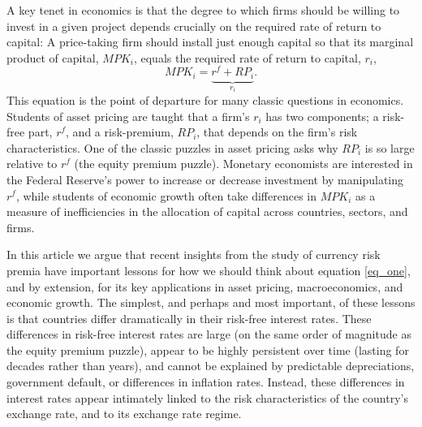 \documentclass{ar-1col}
\begin{document}
A key tenet in economics is that the degree to which firms should be willing to invest in a given project depends crucially on the required rate of return to capital: A price-taking firm should install just enough capital so that its marginal product of capital, $MPK_i$, equals the required rate of return to capital, $r_i$,
\begin{equation}
  MPK_i=\underbrace{r^f+RP_i}_{r_i}.
  \label{eq_one}
\end{equation} 
This equation is the point of departure for many classic questions in economics. Students of asset pricing are taught that a firm's $r_i$ has two components; a risk-free part, $r^f$, and a risk-premium, $RP_i$, that depends on the firm's risk characteristics. One of the classic puzzles in asset pricing asks why $RP_i$ is so large relative to $r^f$ (the equity premium puzzle). Monetary economists are interested in the Federal Reserve's power to increase or decrease investment by manipulating $r^f$, while students of economic growth often take differences in $MPK_i$ as a measure of inefficiencies in the allocation of capital across countries, sectors, and firms.

In this article we argue that recent insights from the study of currency risk premia have important lessons for how we should think about equation \ref{eq_one}, and by extension, for its key applications in asset pricing, macroeconomics, and economic growth. The simplest, and perhaps and most important, of these lessons is that countries differ dramatically in their risk-free interest rates. These differences in risk-free interest rates are large (on the same order of magnitude as the equity premium puzzle), appear to be highly persistent over time (lasting for decades rather than years), and cannot be explained by predictable depreciations, government default, or differences in inflation rates. Instead, these differences in interest rates appear intimately linked to the risk characteristics of the country's exchange rate, and to its exchange rate regime.
\end{document}
